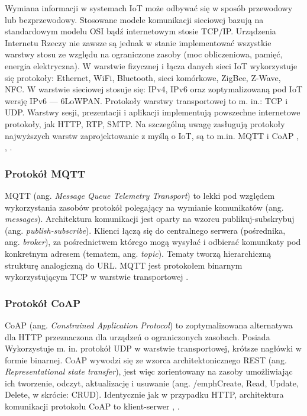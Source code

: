 \documentclass[a4paper, 12pt, twoside]{article}
\begin{document}
Wymiana informacji w systemach IoT może odbywać się w sposób przewodowy lub bezprzewodowy.
Stosowane modele komunikacji sieciowej bazują na standardowym modelu OSI bądź
internetowym stosie TCP/IP. Urządzenia Internetu Rzeczy nie zawsze są jednak 
w stanie implementować wszystkie warstwy stosu ze względu na ograniczone zasoby 
(moc obliczeniowa, pamięć, energia elektryczna). W warstwie fizycznej i łącza danych
sieci IoT wykorzystuje się protokoły: Ethernet, WiFi, Bluetooth, sieci komórkowe,
ZigBee, Z-Wave, NFC. W warstwie sieciowej stosuje się: IPv4, IPv6 oraz zoptymalizowaną
pod IoT wersję IPv6 --- 6LoWPAN. Protokoły warstwy transportowej to m. in.: TCP i UDP. 
Warstwy sesji, prezentacji i aplikacji implementują powszechne internetowe protokoły, jak
HTTP, RTP, SMTP. Na szczególną uwagę zasługują protokoły najwyższych warstw zaprojektowanie
z myślą o IoT, są to m.in. MQTT i CoAP \cite{internet-reczy}, \cite{intro-to-iot}, \cite{iot-hype-to-reality}.

\subsubsection*{Protokół MQTT}

MQTT (ang. \emph{Message Queue Telemetry Transport}) to lekki pod względem wykorzystania zasobów
protokół polegający na wymianie komunikatów (ang. \emph{messages}). Architektura komunikacji
jest oparty na wzorcu publikuj-subskrybuj (ang. \emph{publish-subscribe}).
Klienci łączą się do centralnego serwera (pośrednika, ang. \emph{broker}), za pośrednictwem
którego mogą wysyłać i odbierać komunikaty pod konkretnym adresem (tematem, ang. \emph{topic}).
Tematy tworzą hierarchiczną strukturę analogiczną do URL. MQTT jest protokołem binarnym
wykorzystującym TCP w warstwie transportowej \cite{iot-hype-to-reality}.

\subsubsection*{Protokół CoAP}

CoAP (ang. \emph{Constrained Application Protocol}) to zoptymalizowana alternatywa dla HTTP
przeznaczona dla urządzeń o ograniczonych zasobach. Posiada Wykorzystuje m. in. protokół
UDP w warstwie transportowej, krótsze nagłówki w formie binarnej. 
CoAP wywodzi się ze wzorca architektonicznego REST (ang. \emph{Representational state transfer}), 
jest więc zorientowany na zasoby umożliwiając ich tworzenie, odczyt, aktualizację
i usuwanie (ang. /emph{Create, Read, Update, Delete}, w skrócie: CRUD). 
Identycznie jak w przypadku HTTP, architektura komunikacji protokołu CoAP to klient-serwer 
\cite{intro-to-iot}, \cite{iot-hype-to-reality}.
\end{document}

